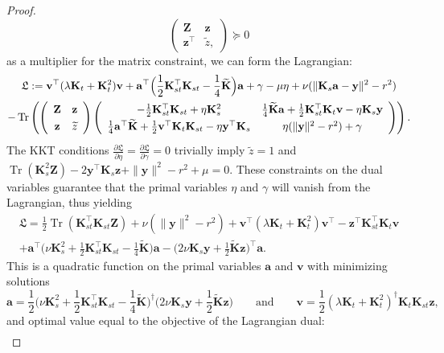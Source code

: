 \documentclass[twoside,11pt]{article}
\DeclareMathOperator{\Tr}{Tr}
\newcommand{\wt}{\widetilde}
\newcommand{\mat}[1]{{\mathbf #1}}
\renewcommand{\a}{\mat{a}}
\newcommand{\1}{\mat{1}}
\newcommand{\Ks}{\mat{K}_s}
\newcommand{\Kst}{\mat{K}_{st}}
\newcommand{\Kt}{\mat{K}_{t}}
\renewcommand{\v}{\mat{v}}
\newcommand{\y}{\mat{y}}
\newcommand{\z}{\mat{z}}
\newcommand{\Z}{\mat{Z}}
\begin{document}
\begin{proof}
\begin{equation*}
\left(
\begin{array}{cc}
\Z & \z \\
\z^\top & \wt z,
\end{array}
\right) \succeq 0
\end{equation*}
as a multiplier for the matrix constraint, we can form the Lagrangian:
\begin{multline*}
\mathfrak{L} := \v^\top (\lambda \Kt + \Kt^2) \v
+ \a^\top \Big(\frac{1}{2} \Kst^\top \Kst - \frac{1}{4}\wt{\mat K} \Big)\a
+ \gamma - \mu \eta + \nu (\|\Ks \a - \y\|^2 - r^2) \\
- \Tr  \left( \left(
\begin{array}{cc}
\Z & \z \\
\z & \wt z
\end{array}
\right)
\left(
\def\arraystretch{1.3}
\begin{array}{cc}
 -\frac{1}{2} \Kst^\top \Kst + \eta \Ks^2
& \frac{1}{4} \wt{\mat K}\a + \frac{1}{2}\Kst^\top \Kt \v - \eta \Ks \y \\
\frac{1}{4} \a^\top \wt{\mat K} + \frac{1}{2}\v^\top \Kt \Kst
- \eta \y^\top \Ks
& \eta (\|\y\|^2 - r^2) + \gamma
\end{array}
\right) \right).
\end{multline*}
The KKT conditions $\frac{\partial \mathfrak L}{\partial \eta} =
\frac{\partial \mathfrak L}{\partial \gamma} = 0$ trivially imply
$\wt z= 1$ and
$\Tr(\Ks^2 \Z) - 2\y^\top \Ks \z + \|\y\|^2 - r^2 + \mu = 0$.
These constraints on the dual variables guarantee that the primal
variables $\eta$ and $\gamma$ will vanish from the Lagrangian, thus
yielding
\begin{multline*}
\mathfrak{L} = \frac{1}{2} \Tr(\Kst^\top \Kst \Z) + \nu(\|\y\|^2 - r^2)
+ \v^\top (\lambda \Kt + \Kt^2) \v^\top - \z^\top \Kst^\top \Kt \v\\
+ \a^\top\Big(\nu \Ks^2 + \frac{1}{2}\Kst^\top \Kst - \frac{1}{4} \wt{\mat K}\Big) \a -\Big(2 \nu  \Ks \y + \frac{1}{2}\wt{\mat K} \z\Big)^\top \a.
\end{multline*}
This is a quadratic function on the primal variables $\a$ and $\v$
with minimizing solutions
\begin{equation*}
\a = \frac{1}{2} \Big(\nu \Ks^2 + \frac{1}{2}\Kst^\top \Kst - \frac{1}{4} \wt{\mat K}\Big)^\dag \Big(2 \nu  \Ks \y + \frac{1}{2}\wt{\mat K} \z\Big)
\qquad \text{and} \qquad
\v = \frac{1}{2}(\lambda \Kt +  \Kt^2)^{\dag}\Kt \Kst \z,
\end{equation*}
and optimal value equal to the objective of the Lagrangian dual:
\begin{multline*}

\end{multline*}
\end{proof}
\end{document}
